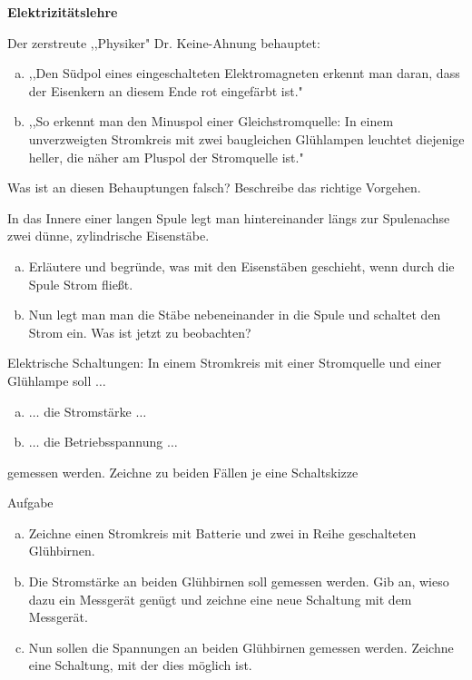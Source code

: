 \documentclass[a4paper]{article}
\begin{document}
{\bf Elektrizitätslehre}
\begin{enumerate}[1.]
{\bf \item Der zerstreute  ,,Physiker" Dr. Keine-Ahnung behauptet:}

\begin{enumerate}[a)]
\item ,,Den Südpol eines eingeschalteten Elektromagneten erkennt man daran, dass der Eisenkern an diesem Ende rot eingefärbt ist."
\item ,,So erkennt man den Minuspol einer Gleichstromquelle: In einem unverzweigten Stromkreis mit zwei baugleichen Glühlampen leuchtet diejenige heller, die näher am Pluspol der Stromquelle ist."
\end{enumerate}
Was ist an diesen Behauptungen falsch? Beschreibe das richtige Vorgehen.

{\bf \item In das Innere einer langen Spule legt man hintereinander längs zur Spulenachse zwei dünne, zylindrische Eisenstäbe.} 
\begin{enumerate}[a)]
\item Erläutere und begründe, was mit den Eisenstäben geschieht, wenn durch die Spule Strom fließt.
\item Nun legt man man die Stäbe nebeneinander in die Spule und schaltet den Strom ein. Was ist jetzt zu beobachten?
\end{enumerate}

{\bf \item Elektrische Schaltungen: In einem Stromkreis mit einer Stromquelle und einer Glühlampe soll 
$\dots$}
\begin{enumerate}[a)]
\item $\dots$ die Stromstärke  $\dots$ 
\item $\dots$ die Betriebsspannung  $\dots$ 
\end{enumerate}
gemessen werden. Zeichne zu beiden Fällen je eine Schaltskizze


{\bf \item Aufgabe}
\begin{enumerate}[a)]
\item Zeichne einen Stromkreis mit Batterie und zwei in Reihe geschalteten Glühbirnen. 
\item Die Stromstärke an beiden Glühbirnen soll gemessen werden. Gib an, wieso dazu ein Messgerät genügt und zeichne eine neue Schaltung mit dem Messgerät.
\item Nun sollen die Spannungen an beiden Glühbirnen gemessen werden. Zeichne eine Schaltung, mit der dies möglich ist. 
\end{enumerate}


\end{enumerate}
\end{document}
